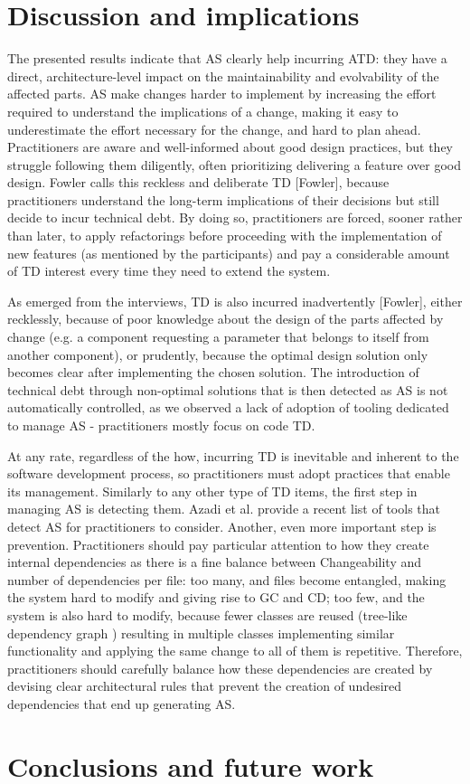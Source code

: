 \section{Discussion and implications}
The presented results indicate that AS clearly help incurring ATD: they have a direct, architecture-level impact on the maintainability and evolvability of the affected parts. AS make changes harder to implement by increasing the effort required to understand the implications of a change, making it easy to underestimate the effort necessary for the change, and hard to plan ahead. Practitioners are aware and well-informed about good design practices, but they struggle following them diligently, often prioritizing delivering a feature over good design. Fowler calls this reckless and deliberate TD [Fowler], because practitioners understand the long-term implications of their decisions but still decide to incur technical debt. By doing so, practitioners are forced, sooner rather than later, to apply refactorings before proceeding with the implementation of new features (as mentioned by the participants) and pay a considerable amount of TD interest every time they need to extend the system. 

As emerged from the interviews, TD is also incurred inadvertently [Fowler], either recklessly, because of poor knowledge about the design of the parts affected by change (e.g. a component requesting a parameter that belongs to itself from another component), or prudently, because the optimal design solution only becomes clear after implementing the chosen solution. The introduction of technical debt through non-optimal solutions that is then detected as AS is not automatically controlled, as we observed a lack of adoption of tooling dedicated to manage AS - practitioners mostly focus on code TD.

At any rate, regardless of the how, incurring TD is inevitable and inherent to the software development process, so practitioners must adopt practices that enable its management. Similarly to any other type of TD items, the first step in managing AS is detecting them. Azadi et al. provide a recent list of tools that detect AS \cite{Azadi2019} for practitioners to consider. Another, even more important step is prevention. Practitioners should pay particular attention to how they create internal dependencies as there is a fine balance between Changeability and number of dependencies per file: too many, and files become entangled, making the system hard to modify and giving rise to GC and CD; too few, and the system is also hard to modify, because fewer classes are reused (tree-like dependency graph  \cite{Lippert2006}) resulting in multiple classes implementing similar functionality and applying the same change to all of them is repetitive. Therefore, practitioners should carefully balance how these dependencies are created by devising clear architectural rules that prevent the creation of undesired dependencies that end up generating AS.

\section{Conclusions and future work}

